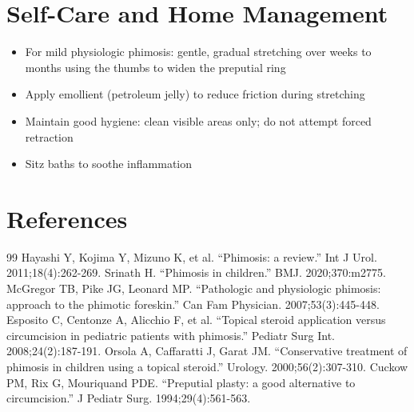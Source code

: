 \section*{Self-Care and Home Management}
\begin{itemize}
  \item For mild physiologic phimosis: gentle, gradual stretching over weeks to months using the thumbs to widen the preputial ring
  \item Apply emollient (petroleum jelly) to reduce friction during stretching
  \item Maintain good hygiene: clean visible areas only; do not attempt forced retraction
  \item Sitz baths to soothe inflammation
\end{itemize}

\section*{References}
\begin{thebibliography}{99}
 Hayashi Y, Kojima Y, Mizuno K, et al. ``Phimosis: a review.'' Int J Urol. 2011;18(4):262-269.
 Srinath H. ``Phimosis in children.'' BMJ. 2020;370:m2775.
 McGregor TB, Pike JG, Leonard MP. ``Pathologic and physiologic phimosis: approach to the phimotic foreskin.'' Can Fam Physician. 2007;53(3):445-448.
 Esposito C, Centonze A, Alicchio F, et al. ``Topical steroid application versus circumcision in pediatric patients with phimosis.'' Pediatr Surg Int. 2008;24(2):187-191.
 Orsola A, Caffaratti J, Garat JM. ``Conservative treatment of phimosis in children using a topical steroid.'' Urology. 2000;56(2):307-310.
 Cuckow PM, Rix G, Mouriquand PDE. ``Preputial plasty: a good alternative to circumcision.'' J Pediatr Surg. 1994;29(4):561-563.
\end{thebibliography}
